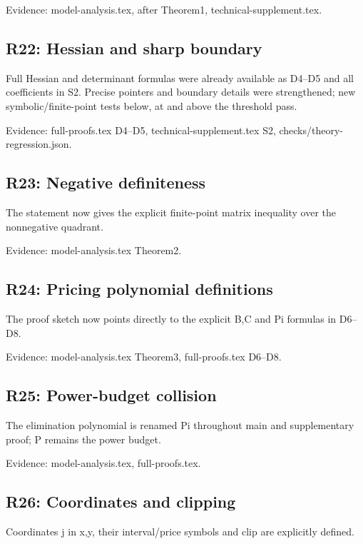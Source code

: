 \documentclass[10pt]{article}
\begin{document}
{\small Evidence: model-analysis.tex, after Theorem1, technical-supplement.tex.}

\subsection*{R22: Hessian and sharp boundary}

Full Hessian and determinant formulas were already available as D4--D5 and all coefficients in S2. Precise pointers and boundary details were strengthened; new symbolic/\allowbreak finite-point tests below, at and above the threshold pass.

{\small Evidence: full-proofs.tex D4--D5, technical-supplement.tex S2, checks/\allowbreak theory-regression.json.}

\subsection*{R23: Negative definiteness}

The statement now gives the explicit finite-point matrix inequality over the nonnegative quadrant.

{\small Evidence: model-analysis.tex Theorem2.}

\subsection*{R24: Pricing polynomial definitions}

The proof sketch now points directly to the explicit B,C and Pi formulas in D6--D8.

{\small Evidence: model-analysis.tex Theorem3, full-proofs.tex D6--D8.}

\subsection*{R25: Power-budget collision}

The elimination polynomial is renamed Pi throughout main and supplementary proof; P remains the power budget.

{\small Evidence: model-analysis.tex, full-proofs.tex.}

\subsection*{R26: Coordinates and clipping}

Coordinates j in {x,y}, their interval/\allowbreak price symbols and clip are explicitly defined.
\end{document}

